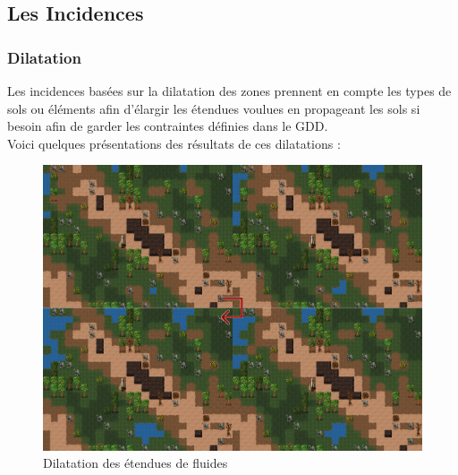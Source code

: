 \documentclass[a4paper]{article}
\newcommand{\alinea}{\hspace*{0.5cm}}
\begin{document}
      \subsection{Les Incidences}
        \subsubsection{Dilatation}
          \alinea Les incidences basées sur la dilatation des zones prennent en compte les types de sols ou éléments afin d'élargir les étendues voulues en propageant les sols si besoin afin de garder les contraintes définies dans le GDD.\\
          \alinea Voici quelques présentations des résultats de ces dilatations :\\
          \begin{figure}
            \begin{center}
              \includegraphics[scale=0.2]{img/DilateFluid.png}
            \end{center}
            \caption{Dilatation des étendues de fluides}
          \end{figure}
\end{document}
